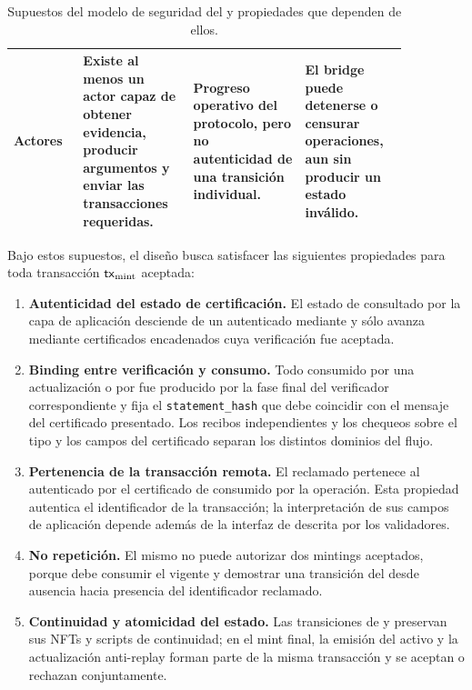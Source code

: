 \begin{table}[H]
\begin{tabular}{p{0.15\linewidth} p{0.24\linewidth} p{0.25\linewidth} p{0.22\linewidth}}
		Actores \Offchain & Existe al menos un actor capaz de obtener evidencia, producir argumentos y enviar las transacciones requeridas. & Progreso operativo del protocolo, pero no autenticidad de una transición individual. & El bridge puede detenerse o censurar operaciones, aun sin producir un estado inválido. \\
		\bottomrule
	\end{tabular}
	\caption{Supuestos del modelo de seguridad del \zkBridge y propiedades que dependen de ellos.}
	\label{tab:bridge-security-assumptions}
\end{table}

Bajo estos supuestos, el diseño busca satisfacer las siguientes propiedades para toda transacción $\mathsf{tx}_{\mathrm{mint}}$ aceptada:

\begin{enumerate}[noitemsep]
	\item \textbf{Autenticidad del estado de certificación.} El estado de \StakeDistribution consultado por la capa de aplicación desciende de un \GenesisCertificate autenticado mediante \GenesisVerificationKey y sólo avanza mediante certificados encadenados cuya verificación \STM fue aceptada.
	\item \textbf{Binding entre verificación y consumo.} Todo \ProofReceipt consumido por una actualización o por \MintTx fue producido por la fase final del verificador correspondiente y fija el \texttt{statement\_hash} que debe coincidir con el mensaje del certificado presentado. Los recibos independientes y los chequeos sobre el tipo y los campos del certificado separan los distintos dominios del flujo.
	\item \textbf{Pertenencia de la transacción remota.} El \TxId reclamado pertenece al \TransactionSnapshot autenticado por el certificado de \CardanoTransactions consumido por la operación. Esta propiedad autentica el identificador de la transacción; la interpretación de sus campos de aplicación depende además de la interfaz de \LockTx descrita por los validadores.
	\item \textbf{No repetición.} El mismo \TxId no puede autorizar dos mintings aceptados, porque \MintTx debe consumir el \TxsUpdaterUTxO vigente y demostrar una transición del \SMT desde ausencia hacia presencia del identificador reclamado.
	\item \textbf{Continuidad y atomicidad del estado.} Las transiciones de \StakeDistributionUTxO y \TxsUpdaterUTxO preservan sus NFTs y scripts de continuidad; en el mint final, la emisión del activo y la actualización anti-replay forman parte de la misma transacción \eUTxO y se aceptan o rechazan conjuntamente.
\end{enumerate}

